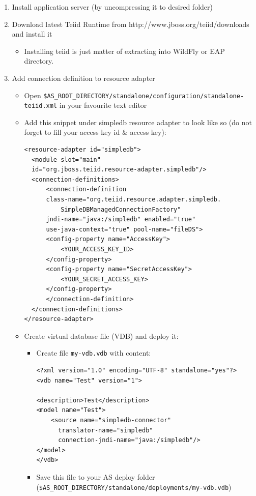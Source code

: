 \documentclass[oneside,12pt]{fithesis2}
\begin{document}
\begin{enumerate}
 \item Install application server (by uncompressing it to desired folder)
 \item Download latest Teiid Runtime from http://www.jboss.org/teiid/downloads and install it
 \begin{itemize}
  \item Installing teiid is just matter of extracting into WildFly or EAP directory.
 \end{itemize}
 \item Add connection definition to resource adapter
 \begin{itemize}
  \item Open \texttt{\$AS\_ROOT\_DIRECTORY/standalone/configuration/\allowbreak standalone-teiid.xml} in your favourite text editor
  \item Add this snippet under simpledb resource adapter to look like so (do not forget to fill your access key id \& access key):
  \begin{Verbatim}[fontsize=\small]
<resource-adapter id="simpledb">
  <module slot="main" 
  id="org.jboss.teiid.resource-adapter.simpledb"/>
  <connection-definitions>
      <connection-definition 
      class-name="org.teiid.resource.adapter.simpledb.
		  SimpleDBManagedConnectionFactory" 
      jndi-name="java:/simpledb" enabled="true" 
      use-java-context="true" pool-name="fileDS">
	  <config-property name="AccessKey">
	      <YOUR_ACCESS_KEY_ID>
	  </config-property>
	  <config-property name="SecretAccessKey">
	      <YOUR_SECRET_ACCESS_KEY>
	  </config-property>
      </connection-definition>
  </connection-definitions>
</resource-adapter>
  \end{Verbatim}
 \item Create virtual database file (VDB) and deploy it:
 \begin{itemize}
  \item Create file \texttt{my-vdb.vdb} with content:
  \begin{Verbatim}[fontsize=\small]
<?xml version="1.0" encoding="UTF-8" standalone="yes"?>
<vdb name="Test" version="1">

<description>Test</description>
<model name="Test">
    <source name="simpledb-connector" 
	  translator-name="simpledb" 
	  connection-jndi-name="java:/simpledb"/>
</model>
</vdb>   
  \end{Verbatim}
 \item Save this file to your AS deploy folder (\texttt{\$AS\_ROOT\_DIRECTORY/\allowbreak standalone/deployments/my-vdb.vdb})
 \end{itemize}

 \end{itemize}

\end{enumerate}
\end{document}
